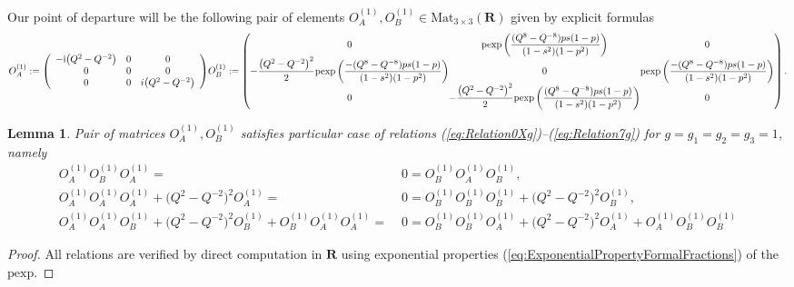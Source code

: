 \documentclass{amsart}
\newtheorem{lemma}[theorem]{Lemma}
\begin{document}
Our point of departure will be the following pair of elements $O_A^{(1)},O_B^{(1)}\in\mathrm{Mat}_{3\times3}(\mathbf R)$ given by explicit formulas
\begin{subequations}
\begin{align}
O_A^{(1)} := 
\left( 
\begin{array}{ccc} 
-\mathrm i \big(Q^2 - Q^{-2}\big) & 0 & 0 \\
0 & 0 & 0 \\
0 & 0 & i \big(Q^2 - Q^{-2}\big)
\end{array} 
\right)
\label{eq:Oa1}
\end{align}
\begin{gather}
\begin{aligned} 
O_B^{(1)}:=\left( 
\begingroup\arraycolsep=0pt
\begin{array}{ccc} 
0 & \mathrm{pexp}\left( \dfrac{(Q^8 - Q^{-8})p s (1-p)}{(1-s^2)(1-p^2)} \right) & 0 \\
-\dfrac{\big(Q^2-Q^{-2}\big)^2}2 \mathrm{pexp}\left( \dfrac{-(Q^8 - Q^{-8})p s (1-p)}{(1-s^2)(1-p^2)} \right)  & 0 & \mathrm{pexp}\left( \dfrac{-(Q^8 - Q^{-8})p s (1-p)}{(1-s^2)(1-p^2)} \right) \\
0 & -\dfrac{\big(Q^2-Q^{-2}\big)^2}2 \mathrm{pexp}\left( \dfrac{(Q^8 - Q^{-8})p s (1-p)}{(1-s^2)(1-p^2)} \right) & 0
\end{array}
\endgroup
\right).
\end{aligned}
\label{eq:Ob1}
\end{gather}
\label{eq:MatricesOa1Ob1}
\end{subequations}

\begin{lemma}
    Pair of matrices $O_A^{(1)},O_B^{(1)}$ satisfies particular case of relations (\ref{eq:Relation0Xg})--(\ref{eq:Relation7g}) for $g=g_1=g_2=g_3=1$, namely
\begin{subequations}
\begin{align}
O_A^{(1)}O_B^{(1)}O_A^{(1)}=\;&0=O_B^{(1)}O_A^{(1)}O_B^{(1)},
\label{eq:MatrixRelations23Forg1}\\
O_A^{(1)}O_A^{(1)}O_A^{(1)}+\big(Q^2-Q^{-2}\big)^2 O_A^{(1)}=\;&0=O_B^{(1)}O_B^{(1)}O_B^{(1)}+\big(Q^2-Q^{-2}\big)^2 O_B^{(1)},
\label{eq:MatrixRelations45Forg1}\\
O_A^{(1)}O_A^{(1)}O_B^{(1)}+\big(Q^2-Q^{-2}\big)^2O_B^{(1)}+O_B^{(1)}O_A^{(1)}O_A^{(1)}=\;&0=O_B^{(1)}O_B^{(1)}O_A^{(1)}+\big(Q^2-Q^{-2}\big)^2O_A^{(1)}+O_A^{(1)}O_B^{(1)}O_B^{(1)}
\label{eq:MatrixRelations67Forg1}
\end{align}
\label{eq:MatrixRelations234567Forg1}
\end{subequations}
\label{lemm:MatrixRelations234567Forg1}
\end{lemma}
\begin{proof}
All relations are verified by direct computation in $\mathbf R$ using exponential properties (\ref{eq:ExponentialPropertyFormalFractions}) of the $\mathrm{pexp}$.
\end{proof}
\end{document}

